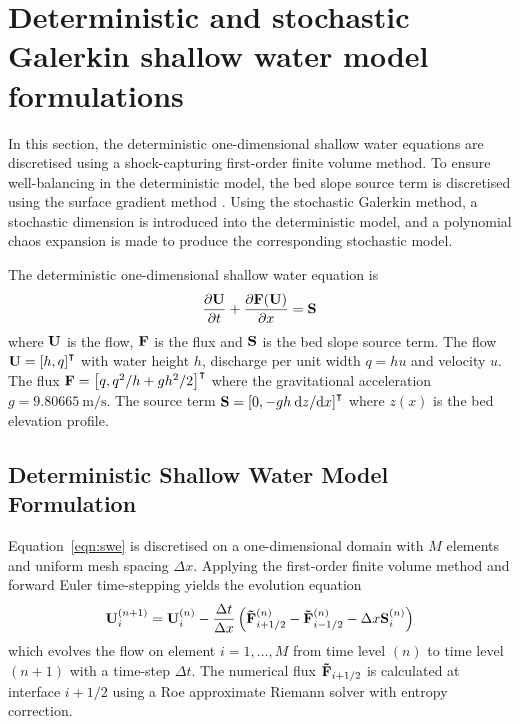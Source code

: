 \section{Deterministic and stochastic Galerkin shallow water model formulations}

In this section, the deterministic one-dimensional shallow water equations are discretised using a shock-capturing first-order finite volume method.
To ensure well-balancing in the deterministic model, the bed slope source term is discretised using the surface gradient method \citep{zhou2001}.
Using the stochastic Galerkin method, a stochastic dimension is introduced into the deterministic model, and a polynomial chaos expansion is made to produce the corresponding stochastic model.

The deterministic one-dimensional shallow water equation is
\begin{align}
    \frac{\partial \mathbf{U}}{\partial t} + \frac{\partial \mathbf{F}(\mathbf{U})}{\partial x} = \mathbf{S} \label{eqn:swe}
\end{align}
where $\mathbf{U}$ is the flow, $\mathbf{F}$ is the flux and $\mathbf{S}$ is the bed slope source term.
The flow $\mathbf{U} = \left[ h, q \right]^\intercal$ with water height $h$, discharge per unit width $q = hu$ and velocity $u$.
The flux $\mathbf{F} = \left[ q,  q^2/h + gh^2/2 \right]^\intercal$ where the gravitational acceleration $g = \SI{9.80665}{\meter\per\second}$.  The source term $\mathbf{S} = \left[ 0, -gh \: \mathrm{d} z / \mathrm{d} x \right]^\intercal$ where $z(x)$ is the bed elevation profile.

\subsection{Deterministic Shallow Water Model Formulation}
Equation~\eqref{eqn:swe} is discretised on a one-dimensional domain with $M$ elements and uniform mesh spacing $\Delta x$.
Applying the first-order finite volume method and forward Euler time-stepping yields the evolution equation
\begin{align}
    \mathbf{U}_i^{(n+1)} = \mathbf{U}_i^{(n)} - \frac{\Delta t}{\Delta x}
    \left( \mathbf{\tilde{F}}_{i+1/2}^{(n)} - \mathbf{\tilde{F}}_{i-1/2}^{(n)}
    - \Delta x \mathbf{S}_i^{(n)} \right) \label{eqn:swe-discrete}
\end{align}
which evolves the flow on element $i = 1, \ldots, M$ from time level $(n)$ to time level $(n+1)$ with a time-step $\Delta t$.  
The numerical flux $\mathbf{\tilde{F}}_{i+1/2}$ is calculated at interface $i+1/2$ using a Roe approximate Riemann solver with entropy correction.

